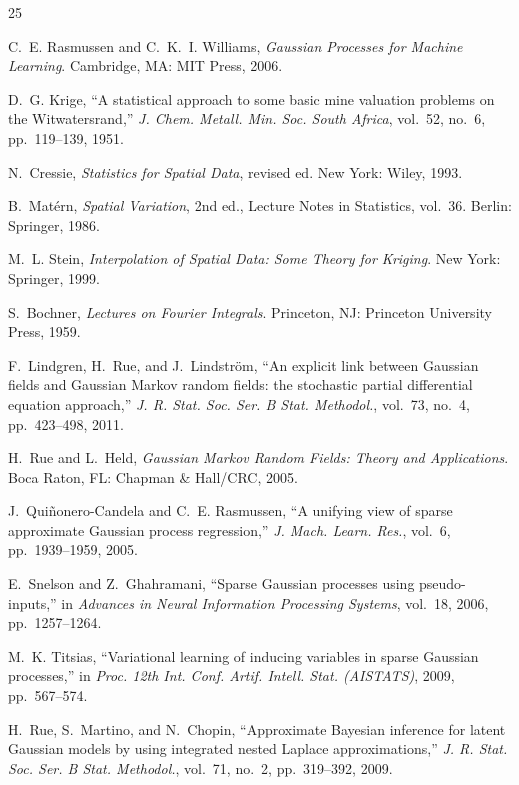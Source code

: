 \documentclass[conference]{IEEEtran}
\begin{document}
\begin{thebibliography}{25}

C.~E. Rasmussen and C.~K.~I. Williams, \emph{Gaussian Processes for Machine Learning}. Cambridge, MA: MIT Press, 2006.

D.~G. Krige, ``A statistical approach to some basic mine valuation problems on the Witwatersrand,'' \emph{J. Chem. Metall. Min. Soc. South Africa}, vol.~52, no.~6, pp.~119--139, 1951.

N.~Cressie, \emph{Statistics for Spatial Data}, revised ed. New York: Wiley, 1993.

B.~Mat\'{e}rn, \emph{Spatial Variation}, 2nd ed., Lecture Notes in Statistics, vol.~36. Berlin: Springer, 1986.

M.~L. Stein, \emph{Interpolation of Spatial Data: Some Theory for Kriging}. New York: Springer, 1999.

S.~Bochner, \emph{Lectures on Fourier Integrals}. Princeton, NJ: Princeton University Press, 1959.

F.~Lindgren, H.~Rue, and J.~Lindstr\"{o}m, ``An explicit link between Gaussian fields and Gaussian Markov random fields: the stochastic partial differential equation approach,'' \emph{J. R. Stat. Soc. Ser. B Stat. Methodol.}, vol.~73, no.~4, pp.~423--498, 2011.

H.~Rue and L.~Held, \emph{Gaussian Markov Random Fields: Theory and Applications}. Boca Raton, FL: Chapman \& Hall/CRC, 2005.

J.~Qui\~{n}onero-Candela and C.~E. Rasmussen, ``A unifying view of sparse approximate Gaussian process regression,'' \emph{J. Mach. Learn. Res.}, vol.~6, pp.~1939--1959, 2005.

E.~Snelson and Z.~Ghahramani, ``Sparse Gaussian processes using pseudo-inputs,'' in \emph{Advances in Neural Information Processing Systems}, vol.~18, 2006, pp.~1257--1264.

M.~K. Titsias, ``Variational learning of inducing variables in sparse Gaussian processes,'' in \emph{Proc. 12th Int. Conf. Artif. Intell. Stat. (AISTATS)}, 2009, pp.~567--574.

H.~Rue, S.~Martino, and N.~Chopin, ``Approximate Bayesian inference for latent Gaussian models by using integrated nested Laplace approximations,'' \emph{J. R. Stat. Soc. Ser. B Stat. Methodol.}, vol.~71, no.~2, pp.~319--392, 2009.


\end{thebibliography}
\end{document}

